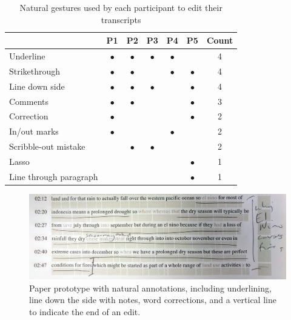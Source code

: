 \begin{table}[ht]
  \centering
  \begin{tabular}{|l|c|c|c|c|c|c|}
    \hline
                            & P1        & P2        & P3        & P4        & P5        & Count \\
    \hline
    Underline               & $\bullet$ & $\bullet$ & $\bullet$ & $\bullet$ &           & 4 \\
    \hline
    Strikethrough           & $\bullet$ & $\bullet$ &           & $\bullet$ & $\bullet$ & 4 \\
    \hline
    Line down side          & $\bullet$ & $\bullet$ & $\bullet$ &           & $\bullet$ & 4 \\
    \hline
    Comments                & $\bullet$ & $\bullet$ &           &           & $\bullet$ & 3 \\
    \hline
    Correction              & $\bullet$ &           &           &           & $\bullet$ & 2 \\
    \hline
    In/out marks            & $\bullet$ &           &           & $\bullet$ &           & 2 \\
    \hline
    Scribble-out mistake    &           & $\bullet$ & $\bullet$ &           &           & 2 \\
    \hline
    Lasso                   &           &           &           &           & $\bullet$ & 1 \\
    \hline
    Line through paragraph  &           &           &           &           & $\bullet$ & 1 \\
    \hline
  \end{tabular}
  \caption{Natural gestures used by each participant to edit their transcripts}
  \label{tab:natural-gestures}
\end{table}

\begin{figure}[h]
  \centering
  \includegraphics[width=\columnwidth]{figs/mockup-cropped}
  \caption{Paper prototype with natural annotations, including
    underlining, line down the side with notes, word corrections, and a
    vertical line to indicate the end of an edit.}
  \label{fig:natural}
\end{figure}

